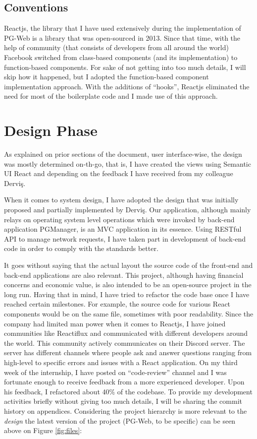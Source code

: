 \subsection{Conventions}

Reactjs, the library that I have used extensively during the implementation 
of PG-Web is a library that was open-sourced in 2013. Since that time, 
with the help of community (that consists of developers from all around the 
world) Facebook switched from class-based components (and its implementation) 
to function-based components. For sake of not getting into too much details, 
I will skip how it happened, but I adopted the function-based component 
implementation approach. With the additions of ``hooks'', Reactjs eliminated 
the need for most of the boilerplate code and I made use of this approach.

\section{Design Phase}
As explained on prior sections of the document, user interface-wise, the 
design was mostly determined on-th-go, that is, I have created the views 
using Semantic UI React and depending on the feedback I have received from 
my colleague Derviş.
\par
When it comes to system design, I have adopted the design that was initially 
proposed and partially implemented by Derviş. Our application, although 
mainly relays on operating system level operations which were invoked by 
back-end application PGManager, is an MVC application in its essence. 
Using RESTful API to manage network requests, I have taken part in 
development of back-end code in order to comply with the standards better.
\par
It goes without saying that the actual layout the source code of the 
front-end and back-end applications are also relevant. This project, 
although having financial concerns and economic value, is also intended 
to be an open-source project in the long run. Having that in mind, I have 
tried to refactor the code base once I have reached certain milestones. 
For example, the source code for various React components would be on the 
same file, sometimes with poor readability. Since the company had limited 
man power when it comes to Reactjs, I have joined communities like Reactiflux 
and communicated with different developers around the world. This community 
actively communicates on their Discord server. The server has different 
channels where people ask and answer questions ranging from high-level to 
specific errors and issues with a React application. On my third week of the 
internship, I have posted on ``code-review'' channel and I was fortunate 
enough to receive feedback from a more experienced developer. Upon his 
feedback, I refactored about 40\% of the codebase. To provide my development 
activities briefly without giving too much details, I will be sharing the 
commit history on appendices. Considering the project hierarchy is more 
relevant to the \textit{design} the latest version of the project 
(PG-Web, to be specific) can be seen above on Figure \ref{fig:files}:

